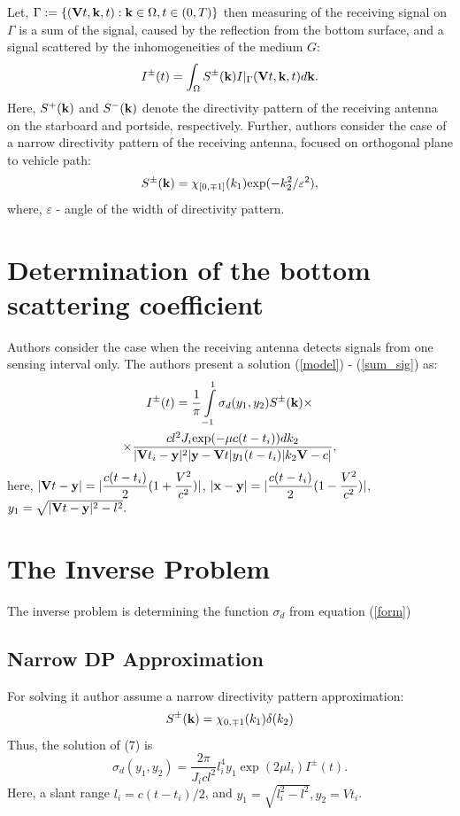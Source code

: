 \documentclass{procDDs}
\begin{document}
Let, $\Gamma := \{ (\mathbf{V}t, \mathbf{k}, t): \mathbf{k} \in \Omega, t \in (0,T) \}$  then measuring of the receiving signal on $\Gamma$ is a sum of the signal, caused by the reflection from the bottom surface, and a signal scattered by the inhomogeneities of the medium $G$:
\begin{multline}
	\label{sum_sig}
	I^\pm(t) = \int_{\Omega} S^\pm(\mathbf{k}) I|_{\Gamma}(\mathbf{V}t, \mathbf{k}, t)d\mathbf{k}.
\end{multline}
Here, $S^+(\mathbf{k})$ and $S^-(\mathbf{k})$ denote the directivity pattern of the receiving antenna on the starboard and portside, respectively. Further, authors consider the case of a narrow directivity pattern of the receiving antenna, focused on orthogonal plane to vehicle path:
\begin{equation}
\label{diagram}
S^\pm(\mathbf{k}) = \chi_{[0,\mp1]}(k_1)  \text{exp}(-k_2^2/\varepsilon^2),
\end{equation}
where, $\varepsilon $ - angle of the width of directivity pattern.

\section{Determination of the bottom scattering coefficient}

Authors consider the case when the receiving antenna detects signals from one sensing interval only. 
The authors present a solution (\ref{model}) - (\ref{sum_sig}) as:
\begin{multline}
	\label{form}
	I^\pm(t) = \frac{1}{\pi}\int\limits_{-1}^{1}\sigma_d(y_1,y_2) S^{\pm}(\mathbf{k}) \times \\ \times
	\frac{ cl^2J_i \text{exp}(-\mu c(t-t_i))dk_2}{|\mathbf{V}t_i-\mathbf{y}|^2|\mathbf{y}-\mathbf{V}t|y_1(t-t_i)|k_2 \mathbf{V}-c|},
\end{multline}
here, $|\mathbf{V}t - \mathbf{y}| = |\dfrac{c(t-t_i)}{2}(1+\dfrac{V^2}{c^2})|$, $|\mathbf{x}-\mathbf{y}| = |\dfrac{c(t-t_i)}{2}(1-\dfrac{V^2}{c^2})|$, $y_1 = \sqrt{|\mathbf{V}t-\mathbf{y}|^2 - l^2}.$

\section{The Inverse Problem}
The inverse problem is determining the function $\sigma_d$ from equation (\ref{form})
\subsection{Narrow DP Approximation}
 For solving it author assume a narrow directivity pattern approximation:
\begin{equation}
S^{\pm}(\mathbf{k}) = \chi_{0,\mp1}(k_1)\delta(k_2)
\end{equation}
Thus, the solution of (7) is
\begin{equation}
	\label{sigma_form}
	\sigma_d \left( y_1, y_2 \right) = \frac{2\pi}{J_icl^2} l_i^4 y_1 \exp(2\mu l_i)I^\pm(t).
\end{equation}
Here, a slant range $l_i=c(t-t_i)/2$, and $y_1=\sqrt{l_i^2-l^2}, y_2=Vt_i$.
\end{document}
